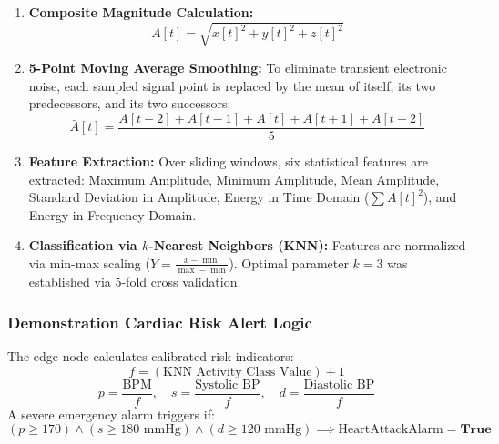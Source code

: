 \documentclass[11pt,a4paper,openany]{report}
\begin{document}
\begin{enumerate}[leftmargin=*]
  \item \textbf{Composite Magnitude Calculation:}
  \begin{equation}
  A[t] = \sqrt{x[t]^2 + y[t]^2 + z[t]^2}
  \end{equation}
  \item \textbf{5-Point Moving Average Smoothing:} To eliminate transient electronic noise, each sampled signal point is replaced by the mean of itself, its two predecessors, and its two successors:
  \begin{equation}
  \bar{A}[t] = \frac{A[t-2] + A[t-1] + A[t] + A[t+1] + A[t+2]}{5}
  \end{equation}
  \item \textbf{Feature Extraction:} Over sliding windows, six statistical features are extracted: Maximum Amplitude, Minimum Amplitude, Mean Amplitude, Standard Deviation in Amplitude, Energy in Time Domain ($\sum A[t]^2$), and Energy in Frequency Domain.
  \item \textbf{Classification via $k$-Nearest Neighbors (KNN):} Features are normalized via min-max scaling ($Y = \frac{x - \min}{\max - \min}$). Optimal parameter $k=3$ was established via 5-fold cross validation.
\end{enumerate}

\subsubsection{Demonstration Cardiac Risk Alert Logic}
The edge node calculates calibrated risk indicators:
\begin{equation}
f = (\text{KNN Activity Class Value}) + 1
\end{equation}
\begin{equation}
p = \frac{\text{BPM}}{f}, \quad s = \frac{\text{Systolic BP}}{f}, \quad d = \frac{\text{Diastolic BP}}{f}
\end{equation}
A severe emergency alarm triggers if:
\begin{equation}
(p \ge 170) \land (s \ge 180\text{ mmHg}) \land (d \ge 120\text{ mmHg}) \implies \text{HeartAttackAlarm} = \mathbf{True}
\end{equation}
\end{document}
